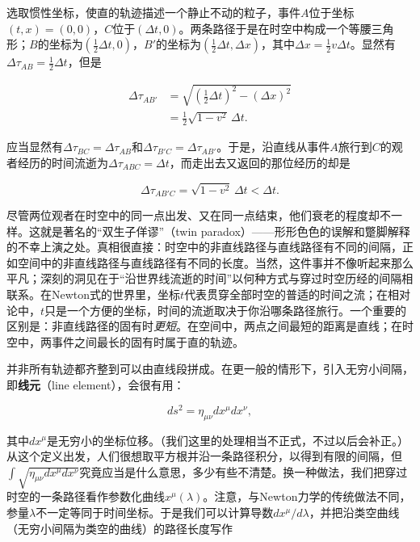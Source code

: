 选取惯性坐标，使直的轨迹描述一个静止不动的粒子，事件$A$位于坐标$(t,x)=(0,0)$，$C$位于$(\Delta t,0)$。两条路径于是在时空中构成一个等腰三角形；$B$的坐标为$(\frac{1}{2}\Delta t,0)$，$B'$的坐标为$(\frac{1}{2}\Delta t,\Delta x)$，其中$\Delta x=\frac{1}{2}v\Delta t$。显然有$\Delta\tau_{AB}=\frac{1}{2}\Delta t$，但是

\begin{equation*}
\begin{aligned}
\Delta\tau_{AB'} &= \sqrt{\left(\tfrac{1}{2}\Delta t\right)^2 - (\Delta x)^2} \\
&= \tfrac{1}{2}\sqrt{1-v^2}\,\Delta t.
\end{aligned}
\tag{1.18}
\end{equation*}

应当显然有$\Delta\tau_{BC}=\Delta\tau_{AB}$和$\Delta\tau_{B'C}=\Delta\tau_{AB'}$。于是，沿直线从事件$A$旅行到$C$的观者经历的时间流逝为$\Delta\tau_{ABC}=\Delta t$，而走出去又返回的那位经历的却是

\begin{equation*}
\Delta\tau_{AB'C} = \sqrt{1-v^2}\,\Delta t < \Delta t.
\tag{1.19}
\end{equation*}

尽管两位观者在时空中的同一点出发、又在同一点结束，他们衰老的程度却不一样。这就是著名的“双生子佯谬”（twin paradox）——形形色色的误解和蹩脚解释的不幸上演之处。真相很直接：时空中的非直线路径与直线路径有不同的间隔，正如空间中的非直线路径与直线路径有不同的长度。当然，这件事并不像听起来那么平凡；深刻的洞见在于“沿世界线流逝的时间”以何种方式与穿过时空历经的间隔相联系。在Newton式的世界里，坐标$t$代表贯穿全部时空的普适的时间之流；在相对论中，$t$只是一个方便的坐标，时间的流逝取决于你沿哪条路径旅行。一个重要的区别是：非直线路径的固有时\emph{更短}。在空间中，两点之间最短的距离是直线；在时空中，两事件之间最长的固有时属于直的轨迹。

并非所有轨迹都齐整到可以由直线段拼成。在更一般的情形下，引入无穷小间隔，即\textbf{线元}（line element），会很有用：

\begin{equation*}
\boxed{ds^2 = \eta_{\mu\nu}dx^\mu dx^\nu,}
\tag{1.20}
\end{equation*}

其中$dx^\mu$是无穷小的坐标位移。（我们这里的处理相当不正式，不过以后会补正。）从这个定义出发，人们很想取平方根并沿一条路径积分，以得到有限的间隔，但$\int\sqrt{\eta_{\mu\nu}dx^\mu dx^\nu}$究竟应当是什么意思，多少有些不清楚。换一种做法，我们把穿过时空的一条路径看作参数化曲线$x^\mu(\lambda)$。注意，与Newton力学的传统做法不同，参量$\lambda$不一定等同于时间坐标。于是我们可以计算导数$dx^\mu/d\lambda$，并把沿类空曲线（无穷小间隔为类空的曲线）的路径长度写作

